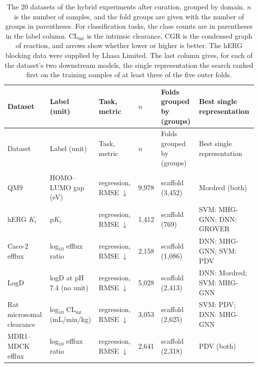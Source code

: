 \begingroup
\footnotesize
\setlength{\tabcolsep}{5pt}
\setlength{\LTcapwidth}{\textwidth}
\begin{longtable}{@{}P{2.6cm}P{2.6cm}P{1.9cm}P{0.9cm}P{2.4cm}P{3.2cm}@{}}
\caption[Datasets of the hybrid experiments.]{The 20 datasets of the hybrid experiments after curation, grouped by domain. $n$ is the number of samples, and the fold groups are given with the number of groups in parentheses. For classification tasks, the class counts are in parentheses in the label column. CL$_\text{int}$ is the intrinsic clearance, CGR is the condensed graph of reaction, and arrows show whether lower or higher is better. The hERG blocking data were supplied by Lhasa Limited. The last column gives, for each of the dataset's two downstream models, the single representation the search ranked first on the training samples of at least three of the five outer folds.}
\label{tab:datasets}\\
\toprule
Dataset & Label (unit) & Task, metric & $n$ & Folds grouped by (groups) & Best single representation \\
\midrule
\endfirsthead
\toprule
Dataset & Label (unit) & Task, metric & $n$ & Folds grouped by (groups) & Best single representation \\
\midrule
\endhead
\bottomrule
\endfoot
{} \\*
QM9 \citep{Ramakrishnan2014, qm9_dataset} & HOMO--LUMO gap (eV) & regression, RMSE $\downarrow$ & 9,978 & scaffold (3,452) & Mordred (both) \\
hERG $K_i$ \citep{Zdrazil2023} & p$K_i$ & regression, RMSE $\downarrow$ & 1,412 & scaffold (769) & SVM: MHG-GNN; DNN: GROVER \\
Caco-2 efflux \citep{openadmet} & log$_{10}$ efflux ratio & regression, RMSE $\downarrow$ & 2,158 & scaffold (1,086) & DNN: MHG-GNN; SVM: PDV \\
LogD \citep{openadmet} & logD at pH 7.4 (no unit) & regression, RMSE $\downarrow$ & 5,028 & scaffold (2,413) & DNN: Mordred; SVM: MHG-GNN \\
Rat microsomal clearance \citep{fang2023, polaris} & log$_{10}$ CL$_\text{int}$ (mL/min/kg) & regression, RMSE $\downarrow$ & 3,053 & scaffold (2,625) & SVM: PDV; DNN: MHG-GNN \\
MDR1--MDCK efflux \citep{fang2023, polaris} & log$_{10}$ efflux ratio & regression, RMSE $\downarrow$ & 2,641 & scaffold (2,318) & PDV (both) \\

\end{longtable}
